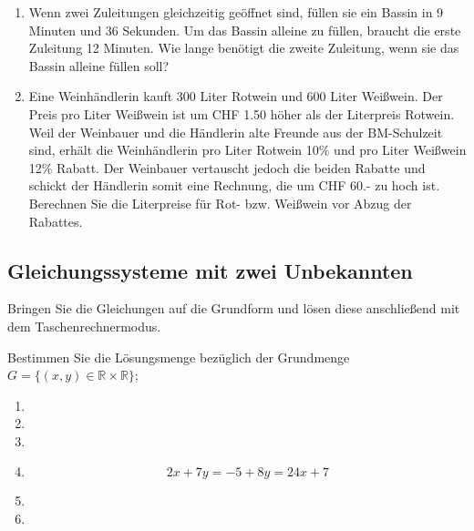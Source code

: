 \begin{enumerate}
\item Wenn zwei Zuleitungen gleichzeitig geöffnet sind, füllen sie ein
  Bassin in 9 Minuten und 36 Sekunden. Um das Bassin alleine zu
  füllen, braucht die erste Zuleitung 12 Minuten. Wie lange benötigt
  die zweite Zuleitung, wenn sie das Bassin alleine füllen soll?

\item Eine Weinhändlerin kauft 300 Liter Rotwein und 600 Liter
  Weißwein. Der Preis pro Liter Weißwein ist um CHF 1.50 höher als der
  Literpreis Rotwein. Weil der Weinbauer und die Händlerin alte
  Freunde aus der BM-Schulzeit sind, erhält die Weinhändlerin pro
  Liter Rotwein 10\% und pro Liter Weißwein 12\% Rabatt.
  Der Weinbauer vertauscht jedoch die beiden Rabatte und schickt der
  Händlerin somit eine Rechnung, die um CHF 60.- zu hoch ist.
  Berechnen Sie die Literpreise für Rot- bzw. Weißwein vor Abzug der
  Rabattes.
\end{enumerate}


\subsection{Gleichungssysteme mit zwei Unbekannten}

  Bringen Sie die Gleichungen auf die Grundform und lösen diese
  anschließend mit dem Taschenrechnermodus.

  Bestimmen Sie die Lösungsmenge bezüglich der Grundmenge $G = \{(x,
  y) \in \mathbb{R}\times\mathbb{R}\}$;

\begin{multicols}{2}
  \begin{enumerate}
  \item
    

  \item

  \item

\item
  $$2x+7y = -5+8y = 24x +7$$
\item

\item
  
  \end{enumerate}
\end{multicols}


